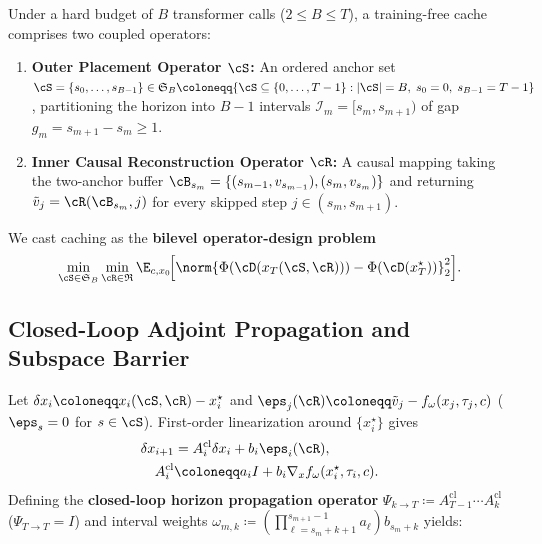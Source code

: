 Under a hard budget of $B$ transformer calls ($2 \le B \le T$), a training-free cache comprises two coupled operators:
\begin{enumerate}
\item \textbf{Outer Placement Operator $\cS$:} An ordered anchor set $\cS = \{s_0, \dots, s_{B-1}\} \in \mathfrak{S}_B \coloneqq \{\cS \subseteq \{0,\dots,T-1\} : |\cS| = B,\; s_0 = 0,\; s_{B-1} = T-1\}$, partitioning the horizon into $B-1$ intervals $\mathcal{I}_m = [s_m, s_{m+1})$ of gap $g_m = s_{m+1} - s_m \ge 1$.
\item \textbf{Inner Causal Reconstruction Operator $\cR$:} A causal mapping taking the two-anchor buffer $\cB_{s_m} = \{(s_{m-1}, v_{s_{m-1}}), (s_m, v_{s_m})\}$ and returning $\tilde{v}_j = \cR(\cB_{s_m}, j)$ for every skipped step $j \in (s_m, s_{m+1})$.
\end{enumerate}
We cast caching as the \textbf{bilevel operator-design problem}
\begin{equation}
\min_{\cS \in \mathfrak{S}_B} \min_{\cR \in \mathfrak{R}} \E_{c, x_0}\!\Bigl[\norm{\Phi(\cD(x_T(\cS, \cR))) - \Phi(\cD(x_T^\star))}_2^2\Bigr].
\label{eq:bilevel}
\end{equation}

\subsection{Closed-Loop Adjoint Propagation and Subspace Barrier}
\label{sec:adjoint}
Let $\delta x_i \coloneqq x_i(\cS, \cR) - x_i^\star$ and $\eps_j(\cR) \coloneqq \tilde{v}_j - f_\omega(x_j, \tau_j, c)$ ($\eps_s = 0$ for $s \in \cS$). First-order linearization around $\{x_i^\star\}$ gives
\begin{equation}
\begin{aligned}
\delta x_{i+1} &= A_i^{\mathrm{cl}} \delta x_i + b_i \eps_i(\cR), \\
A_i^{\mathrm{cl}} &\coloneqq a_i I + b_i \nabla_x f_\omega(x_i^\star, \tau_i, c).
\end{aligned}
\label{eq:linearized_step}
\end{equation}
Defining the \textbf{closed-loop horizon propagation operator} $\Psi_{k \to T} \coloneqq A_{T-1}^{\mathrm{cl}} \cdots A_k^{\mathrm{cl}}$ ($\Psi_{T\to T} = I$) and interval weights $\omega_{m,k} \coloneqq (\prod_{\ell=s_m+k+1}^{s_{m+1}-1} a_\ell) b_{s_m+k}$ yields:

